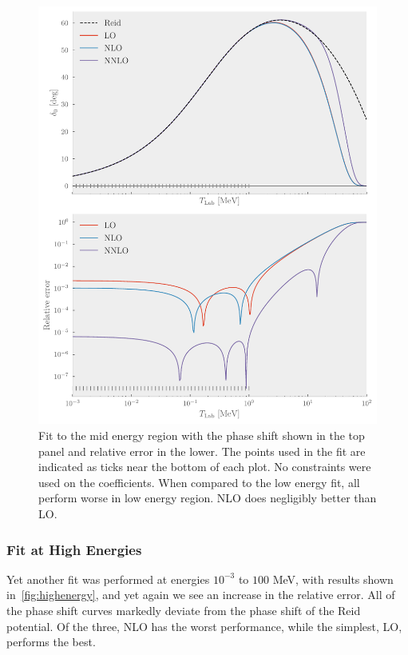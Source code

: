 \begin{figure}[pt]
  \centering
  \includegraphics{Figures/midenergy.pdf}
  \caption{\label{fig:midenergy}Fit to the mid energy region with the phase
    shift shown in the top panel and relative error in the lower. The points
    used in the fit are indicated as ticks near the bottom of each plot. No
    constraints were used on the coefficients. When compared to the low energy
    fit, all perform worse in low energy region. NLO does negligibly better than
  LO.}
\end{figure}

\subsubsection{Fit at High Energies}

Yet another fit was performed at energies \(10^{-3}\) to \(100\) MeV, with
results shown in~\cref{fig:highenergy}, and yet again we see an increase in the
relative error. All of the phase shift curves markedly deviate from the phase
shift of the Reid potential. Of the three, NLO has the worst performance, while
the simplest, LO, performs the best.


